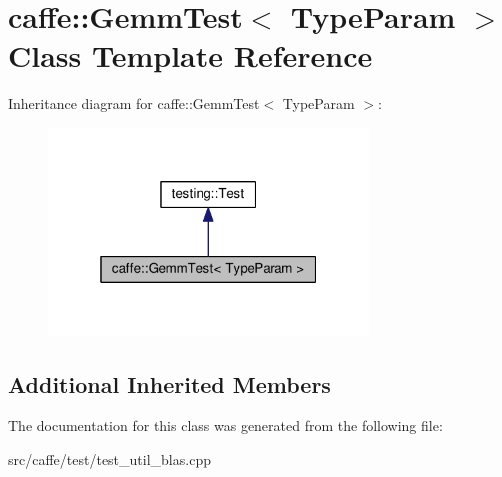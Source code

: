 \hypertarget{classcaffe_1_1_gemm_test}{}\section{caffe\+:\+:Gemm\+Test$<$ Type\+Param $>$ Class Template Reference}
\label{classcaffe_1_1_gemm_test}


Inheritance diagram for caffe\+:\+:Gemm\+Test$<$ Type\+Param $>$\+:
\nopagebreak
\begin{figure}[H]
\begin{center}
\leavevmode
\includegraphics[width=241pt]{classcaffe_1_1_gemm_test__inherit__graph}
\end{center}
\end{figure}
\subsection*{Additional Inherited Members}


The documentation for this class was generated from the following file\+:\begin{DoxyCompactItemize}
\item 
src/caffe/test/test\+\_\+util\+\_\+blas.\+cpp\end{DoxyCompactItemize}
